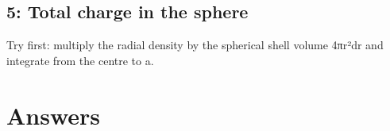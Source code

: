 \documentclass[11pt]{article}
\begin{document}
\begin{keepsection}
\begin{keepsection}
\subsection{5: Total charge in the sphere}

Try first: multiply the radial density by the spherical shell volume 4πr²dr and integrate from the centre to a.

\end{keepsection}
\end{keepsection}


\clearpage
\section{Answers}
\end{document}
